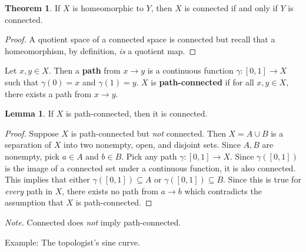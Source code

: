 \documentclass{article}
\newcommand{\nline}{\vspace*{0.5\baselineskip}}
\theoremstyle{definition}
\newtheorem{theorem}{Theorem}[subsection]
\newtheorem{lemma}{Lemma}[subsection]
\begin{document}
\begin{flushleft}
\begin{theorem}
If $X$ is homeomorphic to $Y$, then $X$ is connected if and only if $Y$ is connected.
\end{theorem}

\begin{proof}
A quotient space of a connected space is connected but recall that a homeomorphism, by definition, \textit{is} a quotient map.
\end{proof}

Let $x, y \in X$. Then a \textbf{path} from $x \to y$ is a continuous function $\gamma: [0,1] \to X$ such that $\gamma(0) = x$ and $\gamma(1) = y$. $X$ is \textbf{path-connected} if for all $x, y \in X$, there exists a path from $x \to y$.

\begin{lemma}
If $X$ is path-connected, then it is connected.
\end{lemma}

\begin{proof}
Suppose $X$ is path-connected but \textit{not} connected. Then $X = A \cup B$ is a separation of $X$ into two nonempty, open, and disjoint sets. Since $A,B$ are nonempty, pick $a \in A$ and $b \in B$. Pick any path $\gamma: [0,1] \to X$. Since $\gamma([0,1])$ is the image of a connected set under a continuous function, it is also connected. This implies that either $\gamma([0,1]) \subseteq A$ or $\gamma([0,1]) \subseteq B$. Since this is true for \textit{every} path in $X$, there exists no path from $a \to b$ which contradicts the assumption that $X$ is path-connected.
\end{proof}

\textit{Note.} Connected does \textit{not} imply path-connected.

\nline

Example: The topologist's sine curve.


\end{flushleft}
\end{document}
